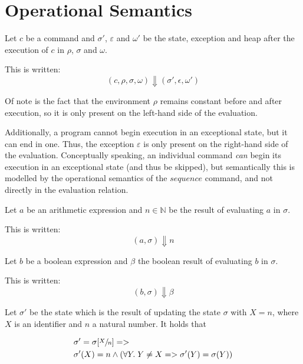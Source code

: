 
\section{Operational Semantics}\label{sec:opsem}

\begin{notation}
Let $c$ be a command and $\sigma'$, $\varepsilon$ and $\omega'$ be the state, exception and heap after the execution of $c$ in $\rho$, $\sigma$ and $\omega$.

This is written:
\begin{equation}
(c,\rho,\sigma,\omega) \Downarrow (\sigma',\epsilon,\omega')
\end{equation}

Of note is the fact that the environment $\rho$ remains constant before and after execution, so it is only present on the left-hand side of the evaluation.

Additionally, a program cannot begin execution in an exceptional state, but it can end in one. Thus, the exception $\varepsilon$ is only present on the right-hand side of the evaluation. Conceptually speaking, an individual command \emph{can} begin its execution in an exceptional state (and thus be skipped), but semantically this is modelled by the operational semantics of the $sequence$ command, and not directly in the evaluation relation.
\end{notation}

\begin{notation}
Let $a$ be an arithmetic expression and $n\in\mathbb{N}$ be the result of evaluating $a$ in $\sigma$.

This is written:
\begin{equation}
(a,\sigma) \Downarrow n
\end{equation}
\end{notation}

\begin{notation}
Let $b$ be a boolean expression and $\beta$ the boolean result of evaluating $b$ in $\sigma$.

This is written:
\begin{equation}
(b,\sigma) \Downarrow \beta
\end{equation}
\end{notation}

\begin{defn}\label{def:state-update}
Let $\sigma'$ be the state which is the result of updating the state $\sigma$ with $X = n$, where $X$ is an identifier and $n$ a natural number. It holds that

\begin{equation}
\begin{split}
&\sigma' = \sigma[\sfrac{X}{n}] =>\\
&\sigma'(X) = n \wedge (\forall Y.\; Y \neq X => \sigma'(Y) = \sigma(Y))
\end{split}
\end{equation}
\end{defn}

